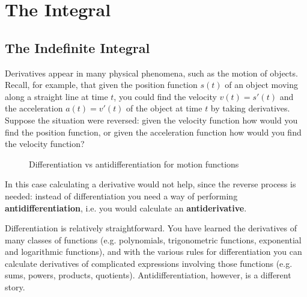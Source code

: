 \chapter{The Integral}
\section{The Indefinite Integral}
Derivatives appear in many physical phenomena, such as the motion of objects.
Recall, for example, that given the position function $s(t)$ of an object moving
along a straight line at time $t$, you could find the velocity $v(t)=s'(t)$ and
the acceleration $a(t)=v'(t)$ of the object at time $t$ by taking derivatives.
Suppose the situation were reversed: given the velocity function how would you
find the position function, or given the acceleration function how would you
find the velocity function?

\begin{figure}[ht]
 \begin{center}
 \vspace{-5mm}
 \end{center}
 \caption[]{\quad Differentiation vs antidifferentiation for motion functions}
 \label{fig:antideriv}
\end{figure}

In this case calculating a derivative would not help, since the reverse
process is needed: instead of differentiation you need a way of performing
\textbf{antidifferentiation}, i.e. you would calculate an
\textbf{antiderivative}.


Differentiation is relatively straightforward. You have learned the
derivatives of many classes of functions (e.g. polynomials, trigonometric
functions, exponential and logarithmic functions), and with the various rules
for differentiation you can calculate derivatives of complicated expressions
involving those functions (e.g. sums, powers, products, quotients).
Antidifferentiation, however, is a different story.

